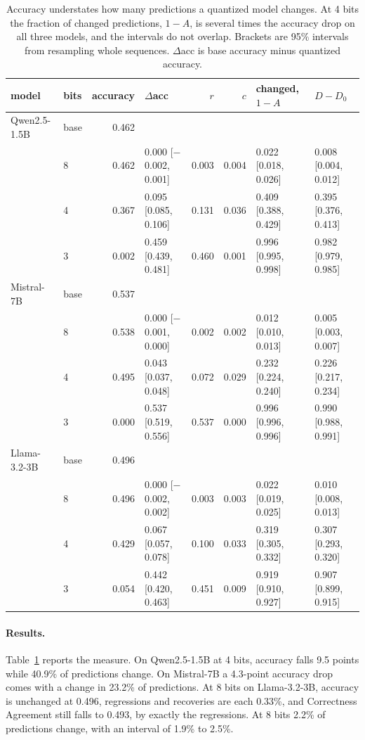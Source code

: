 \documentclass[10pt]{article}
\begin{document}
\begin{table}[t]
\centering
\footnotesize
\setlength{\tabcolsep}{4pt}
\begin{tabular}{llrlrrll}
\toprule
model & bits & accuracy & $\Delta$acc & $r$ & $c$ & changed, $1-A$ & $D - D_0$ \\
\midrule
Qwen2.5-1.5B & base & 0.462 & & & & & \\
 & 8 & 0.462 & 0.000 [$-$0.002, 0.001] & 0.003 & 0.004 & 0.022 [0.018, 0.026] & 0.008 [0.004, 0.012] \\
 & 4 & 0.367 & 0.095 [0.085, 0.106] & 0.131 & 0.036 & 0.409 [0.388, 0.429] & 0.395 [0.376, 0.413] \\
 & 3 & 0.002 & 0.459 [0.439, 0.481] & 0.460 & 0.001 & 0.996 [0.995, 0.998] & 0.982 [0.979, 0.985] \\
\midrule
Mistral-7B & base & 0.537 & & & & & \\
 & 8 & 0.538 & 0.000 [$-$0.001, 0.000] & 0.002 & 0.002 & 0.012 [0.010, 0.013] & 0.005 [0.003, 0.007] \\
 & 4 & 0.495 & 0.043 [0.037, 0.048] & 0.072 & 0.029 & 0.232 [0.224, 0.240] & 0.226 [0.217, 0.234] \\
 & 3 & 0.000 & 0.537 [0.519, 0.556] & 0.537 & 0.000 & 0.996 [0.996, 0.996] & 0.990 [0.988, 0.991] \\
\midrule
Llama-3.2-3B & base & 0.496 & & & & & \\
 & 8 & 0.496 & 0.000 [$-$0.002, 0.002] & 0.003 & 0.003 & 0.022 [0.019, 0.025] & 0.010 [0.008, 0.013] \\
 & 4 & 0.429 & 0.067 [0.057, 0.078] & 0.100 & 0.033 & 0.319 [0.305, 0.332] & 0.307 [0.293, 0.320] \\
 & 3 & 0.054 & 0.442 [0.420, 0.463] & 0.451 & 0.009 & 0.919 [0.910, 0.927] & 0.907 [0.899, 0.915] \\
\bottomrule
\end{tabular}
\caption{Accuracy understates how many predictions a quantized model changes. At 4 bits the
fraction of changed predictions, $1-A$, is several times the accuracy drop on all three models,
and the intervals do not overlap. Brackets are 95\% intervals from resampling whole sequences.
$\Delta$acc is base accuracy minus quantized accuracy.}
\label{tab:agree}
\end{table}

\paragraph{Results.} Table~\ref{tab:agree} reports the measure. On Qwen2.5-1.5B at 4 bits,
accuracy falls 9.5 points while 40.9\% of predictions change. On Mistral-7B a 4.3-point
accuracy drop comes with a change in 23.2\% of predictions. At 8 bits on Llama-3.2-3B,
accuracy is unchanged at 0.496, regressions and recoveries are each 0.33\%, and Correctness
Agreement still falls to 0.493, by exactly the regressions. At 8 bits 2.2\% of predictions
change, with an interval of 1.9\% to 2.5\%.
\end{document}
